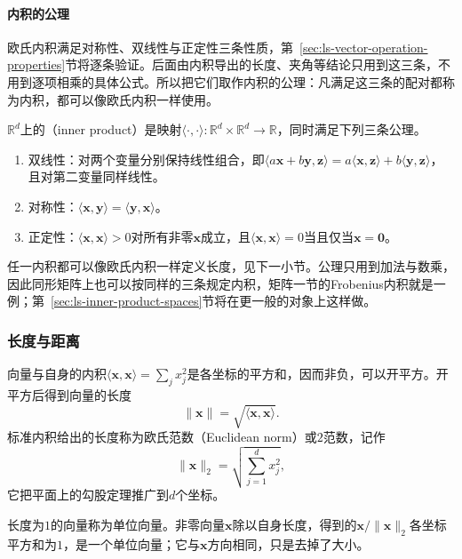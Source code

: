 \paragraph{内积的公理}
欧氏内积满足对称性、双线性与正定性三条性质，第~\ref{sec:ls-vector-operation-properties}节将逐条验证。后面由内积导出的长度、夹角等结论只用到这三条，不用到逐项相乘的具体公式。所以把它们取作内积的公理：凡满足这三条的配对都称为内积，都可以像欧氏内积一样使用。
\begin{definition}[实内积]
\label{def:linear-algebra-inner-product}
$\mathbb R^d$上的（inner product）是映射$\langle\cdot,\cdot\rangle:\mathbb R^d\times\mathbb R^d\to\mathbb R$，同时满足下列三条公理。
\begin{enumerate}
 \item 双线性：对两个变量分别保持线性组合，即$\langle a\bm x+b\bm y,\bm z\rangle=a\langle\bm x,\bm z\rangle+b\langle\bm y,\bm z\rangle$，且对第二变量同样线性。
 \item 对称性：$\langle\bm x,\bm y\rangle=\langle\bm y,\bm x\rangle$。
 \item 正定性：$\langle\bm x,\bm x\rangle>0$对所有非零$\bm x$成立，且$\langle\bm x,\bm x\rangle=0$当且仅当$\bm x=\bm0$。
\end{enumerate}
\end{definition}
任一内积都可以像欧氏内积一样定义长度，见下一小节。公理只用到加法与数乘，因此同形矩阵上也可以按同样的三条规定内积，矩阵一节的Frobenius内积就是一例；第~\ref{sec:ls-inner-product-spaces}节将在更一般的对象上这样做。

\subsubsection{长度与距离}
\label{sec:linear-algebra-length-angle-distance}

向量与自身的内积$\langle\bm x,\bm x\rangle=\sum_jx_j^2$是各坐标的平方和，因而非负，可以开平方。开平方后得到向量的长度
\begin{equation}
 \lVert\bm x\rVert=\sqrt{\langle\bm x,\bm x\rangle}.
 \label{eq:linear-algebra-inner-product-norm}
\end{equation}
标准内积给出的长度称为欧氏范数（Euclidean norm）或$2$范数，记作
\[
 \lVert\bm x\rVert_2=\sqrt{\sum_{j=1}^d x_j^2},
\]
它把平面上的勾股定理推广到$d$个坐标。

长度为$1$的向量称为单位向量。非零向量$\bm x$除以自身长度，得到的$\bm x/\lVert\bm x\rVert_2$各坐标平方和为$1$，是一个单位向量；它与$\bm x$方向相同，只是去掉了大小。

